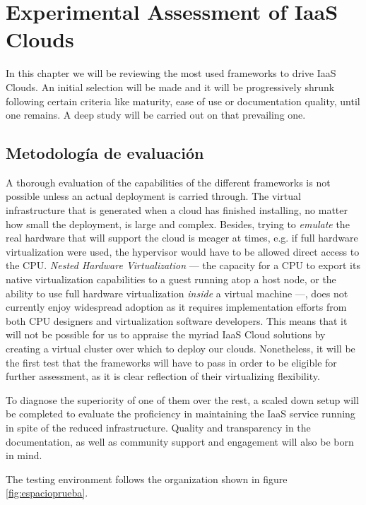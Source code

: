 \chapter{Experimental Assessment of IaaS Clouds}\label{cap:evaliaas}

\noindent In this chapter we will be reviewing the most used frameworks to drive IaaS Clouds. An initial selection will be made and it will be progressively shrunk following certain criteria like maturity, ease of use or documentation quality, until one remains. A deep study will be carried out on that prevailing one.

\section{Metodolog\'ia de evaluaci\'on}\label{sec:evaluacion}

\noindent A thorough evaluation of the capabilities of the different frameworks is not possible unless an actual deployment is carried through. The virtual infrastructure that is generated when a cloud has finished installing, no matter how small the deployment, is large and complex. Besides, trying to \emph{emulate} the real hardware that will support the cloud is meager at times, e.g. if full hardware virtualization were used, the hypervisor would have to be allowed direct access to the CPU. \emph{Nested Hardware Virtualization} --- the capacity for a CPU to export its native virtualization capabilities to a guest running atop a host node, or the ability to use full hardware virtualization \emph{inside} a virtual machine ---, does not currently enjoy widespread adoption as it requires implementation efforts from both CPU designers and virtualization software developers. This means that it will not be possible for us to appraise the myriad IaaS Cloud solutions by creating a virtual cluster over which to deploy our clouds. Nonetheless, it will be the first test that the frameworks will have to pass in order to be eligible for further assessment, as it is clear reflection of their virtualizing flexibility.

To diagnose the superiority of one of them over the rest, a scaled down setup will be completed to evaluate the proficiency in maintaining the IaaS service running in spite of the reduced infrastructure. Quality and transparency in the documentation, as well as community support and engagement will also be born in mind.

The testing environment follows the organization shown in figure \ref{fig:espacioprueba}.

